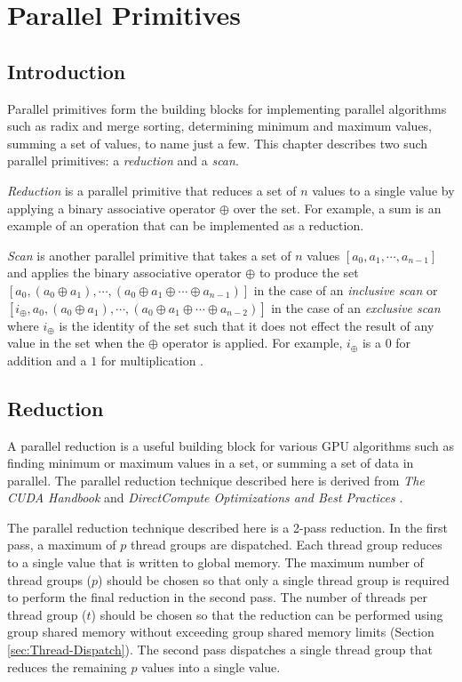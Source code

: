 
\chapter{Parallel Primitives} %
\label{ch:ParallelPrimitives}

\section{Introduction}

Parallel primitives form the building blocks for implementing parallel algorithms such as radix and merge sorting, determining minimum and maximum values, summing a set of values, to name just a few. This chapter describes two such parallel primitives: a \emph{reduction} and a \emph{scan}.

\emph{Reduction} is a parallel primitive that reduces a set of $n$ values to a single value by applying a binary associative operator $\oplus$ over the set. For example, a sum is an example of an operation that can be implemented as a reduction.

\emph{Scan} is another parallel primitive that takes a set of $n$ values $[a_0, a_1, \cdots, a_{n-1}]$ and applies the binary associative operator $\oplus$ to produce the set $[a_0,(a_0\oplus a_1),\cdots,(a_0\oplus a_1\oplus\cdots\oplus a_{n-1})]$ in the case of an \emph{inclusive scan} or $[i_{\oplus},a_0,(a_0\oplus a_1),\cdots,(a_0\oplus a_1\oplus\cdots\oplus a_{n-2})]$ in the case of an \emph{exclusive scan} where $i_{\oplus}$ is the identity of the set such that it does not effect the result of any value in the set when the $\oplus$ operator is applied. For example, $i_{\oplus}$ is a $0$ for addition and a $1$ for multiplication \parencite{35_blelloch_1989, 23_wilt_2013}.

\section{Reduction}
\label{sec:Reduction}

A parallel reduction is a useful building block for various GPU algorithms such as finding minimum or maximum values in a set, or summing a set of data in parallel. The parallel reduction technique described here is derived from \emph{The CUDA Handbook} \parencite{23_wilt_2013} and \emph{DirectCompute Optimizations and Best Practices} \parencite{29_young_2010}.

The parallel reduction technique described here is a 2-pass reduction. In the first pass, a maximum of $p$ thread groups are dispatched. Each thread group reduces to a single value that is written to global memory. The maximum number of thread groups ($p$) should be chosen so that only a single thread group is required to perform the final reduction in the second pass. The number of threads per thread group ($t$) should be chosen so that the reduction can be performed using group shared memory without exceeding group shared memory limits (Section \ref{sec:Thread-Dispatch}). The second pass dispatches a single thread group that reduces the remaining $p$ values into a single value.


